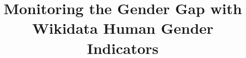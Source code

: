 \documentclass{sig-alternate-05-2015}
\begin{document}






%

\title{Monitoring the Gender Gap with Wikidata Human Gender Indicators}

%
%
%
%
%
\end{document}
